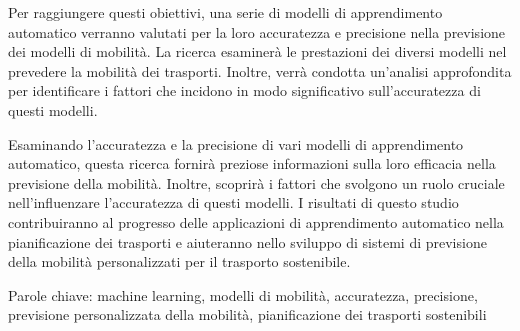 Per raggiungere questi obiettivi, una serie di modelli di apprendimento automatico verranno valutati per la loro accuratezza e precisione nella previsione dei modelli di mobilità. La ricerca esaminerà le prestazioni dei diversi modelli nel prevedere la mobilità dei trasporti. Inoltre, verrà condotta un’analisi approfondita per identificare i fattori che incidono in modo significativo sull’accuratezza di questi modelli.

Esaminando l’accuratezza e la precisione di vari modelli di apprendimento automatico, questa ricerca fornirà preziose informazioni sulla loro efficacia nella previsione della mobilità. Inoltre, scoprirà i fattori che svolgono un ruolo cruciale nell’influenzare l’accuratezza di questi modelli. I risultati di questo studio contribuiranno al progresso delle applicazioni di apprendimento automatico nella pianificazione dei trasporti e aiuteranno nello sviluppo di sistemi di previsione della mobilità personalizzati per il trasporto sostenibile.

Parole chiave: machine learning, modelli di mobilità, accuratezza, precisione, previsione personalizzata della mobilità, pianificazione dei trasporti sostenibili

